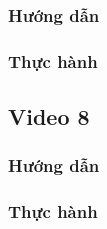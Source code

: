 \documentclass{article}
\begin{document}
\subsubsection{Hướng dẫn}

\subsubsection{Thực hành}




\subsection{Video 8}
\subsubsection{Hướng dẫn}

\subsubsection{Thực hành}








\end{document}
